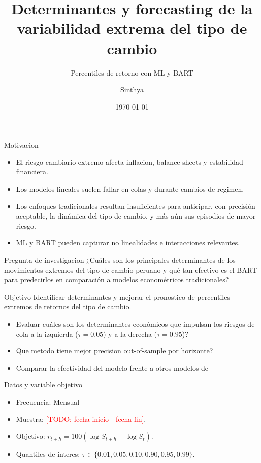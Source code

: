 ﻿\documentclass[aspectratio=169,10pt]{beamer}
\title{Determinantes y forecasting de la variabilidad extrema del tipo de cambio}
\subtitle{Percentiles de retorno con ML y BART}
\author{Sinthya}
\institute{Tu Institucion}
\date{\today}
\newcommand{\todo}[1]{\textcolor{red}{[TODO: #1]}}
\begin{document}
\begin{frame}
  \titlepage
\end{frame}

\begin{frame}{Motivacion}
\begin{itemize}
    \item El riesgo cambiario extremo afecta inflacion, balance sheets y estabilidad financiera.
    \item Los modelos lineales suelen fallar en colas y durante cambios de regimen.
    \item Los enfoques tradicionales resultan insuficientes para anticipar, con precisión aceptable, la dinámica del tipo de cambio, y más aún sus episodios de mayor riesgo. 
    \item ML y BART pueden capturar no linealidades e interacciones relevantes.
\end{itemize}
\end{frame}

\begin{frame}{Pregunta de investigacion}
¿Cuáles son los principales determinantes de los movimientos extremos del tipo de cambio peruano y qué tan efectivo es el BART para predecirlos en comparación a modelos econométricos tradicionales?
\begin{block}{Objetivo}
Identificar determinantes y mejorar el pronostico de percentiles extremos de retornos del tipo de cambio.
\end{block}

\begin{itemize}
    \item Evaluar cuáles son los determinantes económicos que impulsan los riesgos de cola a la izquierda ($\tau=0.05$) y a la derecha ($\tau=0.95$)?
    \item Que metodo tiene mejor precision out-of-sample por horizonte?
    \item Comparar la efectividad del modelo frente a otros modelos de 
\end{itemize}
\end{frame}

\begin{frame}{Datos y variable objetivo}
\begin{itemize}
    \item Frecuencia: Mensual
    \item Muestra: \todo{fecha inicio - fecha fin}.
    \item Objetivo: $r_{t+h}=100(\log S_{t+h}-\log S_t)$.
    \item Quantiles de interes: $\tau\in\{0.01,0.05,0.10,0.90,0.95,0.99\}$.
\end{itemize}
\end{frame}
\end{document}
